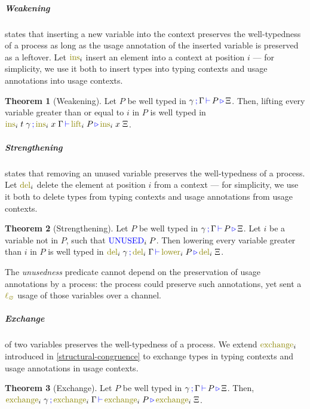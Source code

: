 \documentclass[sigplan,10pt,anonymous,review]{acmart}
\theoremstyle{definition}
\newtheorem{nitheorem}{Theorem}
\newcommand{\type}[1]{\textcolor{blue}{\operatorname{#1}}}
\newcommand{\func}[1]{\textcolor{olive}{\operatorname{#1}}}
\newcommand{\lz}{\func{\ell_{\varnothing}}}
\newcommand{\types}[4]{#1 \, \type{;} \, #2 \, \type{\vdash} \, #3 \, \type{\triangleright} \, #4}
\newcommand{\Unused}{\type{UNUSED}}
\begin{document}
\subparagraph*{Weakening}
states that inserting a new variable into the context preserves the well-typedness of a process as long as the usage annotation of the inserted variable is preserved as a leftover.
Let $\func{ins}_i$ insert an element into a context at position $i$ --- for simplicity, we use it both to insert types into typing contexts and usage annotations into usage contexts.
\begin{nitheorem}[Weakening]
  \label{thm:weakening}
  Let $P$ be well typed in $\types{\gamma}{\Gamma}{P}{\Xi}$.
  Then, lifting every variable greater than or equal to $i$ in $P$ is well typed in
  $\types{\func{ins}_i \; t \; \gamma}{\func{ins}_i \; x \; \Gamma}{\func{lift}_i \; P}{\func{ins}_i \; x \; \Xi}$.
\end{nitheorem}

\subparagraph*{Strengthening}
states that removing an unused variable preserves the well-typedness of a process.
Let $\func{del}_i$ delete the element at position $i$ from a context --- for simplicity, we use it both to delete types from typing contexts and usage annotations from usage contexts.
\begin{nitheorem}[Strengthening]
  \label{thm:strengthening} 
  Let $P$ be well typed in $\types{\gamma}{\Gamma}{P}{\Xi}$.
  Let $i$ be a variable not in $P$, such that $\Unused_i \; P$.
  Then lowering every variable greater than $i$ in $P$ is well typed in $\types{\func{del}_i \; \gamma}{\func{del}_i \; \Gamma}{\func{lower}_i \; P}{\func{del}_i \; \Xi}$.
\end{nitheorem}

  The \emph{unusedness} predicate cannot depend on the preservation of usage annotations by a process: the process could preserve such annotations, yet sent a $\lz$ usage of those variables over a channel.

\subparagraph*{Exchange}
of two variables preserves the well-typedness of a process.
We extend $\func{exchange}_i$  introduced in \autoref{structural-congruence} to exchange types in typing contexts and usage annotations in usage contexts.
\begin{nitheorem}[Exchange]
  \label{thm:exchange}
  Let $P$ be well typed in $\types{\gamma}{\Gamma}{P}{\Xi}$.
  Then, $\types{\func{exchange}_i \; \gamma}{\func{exchange}_i \; \Gamma}{\allowbreak \func{exchange}_i \; P}{\func{exchange}_i \; \Xi}$.
\end{nitheorem}
\end{document}
